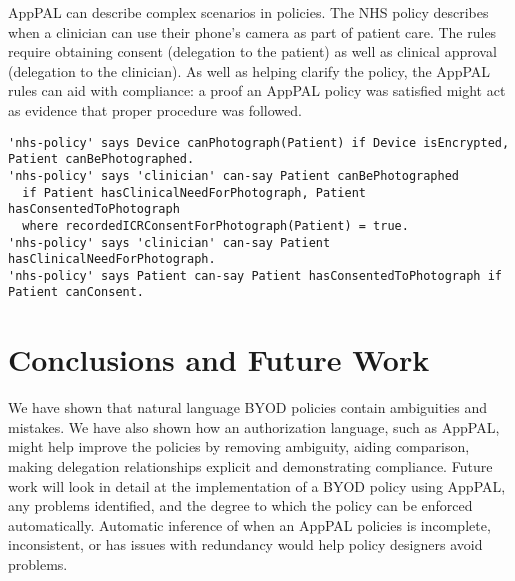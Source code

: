 \documentclass{easychair}
\newcommand{\dotdotdot}[1]{$[\cdots]$}
\begin{document}
AppPAL can describe complex scenarios in policies.
The NHS policy describes when a clinician can use their phone's camera as part of patient care.
The rules require obtaining consent (delegation to the patient) as well as clinical approval (delegation to the clinician). 
As well as helping clarify the policy, the AppPAL rules can aid with compliance:
    a proof an AppPAL policy was satisfied might act as evidence that proper procedure was followed.
\begin{lstlisting}[title={\footnotesize\textbf{NHS}:~\itshape ``%
Some mobile devices have the ability to take photographs / videos. 
This function should not be used for photographs / videos of an individual’s care and treatment unless the device has encryption enabled and it is clinically appropriate to do so.
If the photography / video facility is used as part of the recording of an individual’s care and treatment, the device user must ensure that the consent of the individual has been collected prior to taking any photograph / video. 
\dotdotdot{The individual needs to fully understand why the photograph / video is being taken and the member of staff plans to do with it, in particular if it will be shared. }
A record of the consent must be entered into the individual’s care record. 
''}]
'nhs-policy' says Device canPhotograph(Patient) if Device isEncrypted, Patient canBePhotographed.
'nhs-policy' says 'clinician' can-say Patient canBePhotographed
  if Patient hasClinicalNeedForPhotograph, Patient hasConsentedToPhotograph
  where recordedICRConsentForPhotograph(Patient) = true.
'nhs-policy' says 'clinician' can-say Patient hasClinicalNeedForPhotograph.
'nhs-policy' says Patient can-say Patient hasConsentedToPhotograph if Patient canConsent.
\end{lstlisting}

\section{Conclusions and Future Work}

We have shown that natural language BYOD policies contain ambiguities and mistakes.
We have also shown how an authorization language, such as AppPAL, might help improve the policies by removing ambiguity, aiding comparison, making delegation relationships explicit and demonstrating compliance.
Future work will look in detail at the implementation of a BYOD policy using AppPAL, any problems identified, and the degree to which the policy can be enforced automatically.
Automatic inference of when an AppPAL policies is incomplete, inconsistent, or has issues with redundancy would help policy designers avoid problems.
\end{document}
